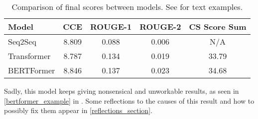 \begin{table}[h]
	\centering
	\scriptsize
	\begin{tabular}{l | c c c c}
		\toprule
			Model & CCE & ROUGE-1 & ROUGE-2 & CS Score Sum \\
		\midrule
			Seq2Seq & 8.809 & 0.088 & 0.006 & N/A\footnotemark{} \\
			Transformer & 8.787 & 0.134 & 0.019 & 33.79 \\
			BERTFormer & 8.846 & 0.137 & 0.023 & 34.68 \\
		\bottomrule
	\end{tabular}
	\caption{Comparison of final scores between models. See \appendixA{} for text examples.}
	\label{comparison_table}
\end{table}

Sadly, this model keeps giving nonsensical and unworkable results, as seen in \cref{bertformer_example} in \appendixA{}.
Some reflections to the causes of this result and how to possibly fix them appear in \cref{reflections_section}.

